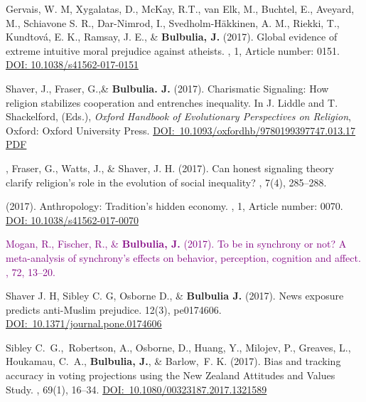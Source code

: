 \documentclass{article}
\begin{document}
\begin{thebibliography}{99}
Gervais, W. M, Xygalatas, D., McKay, R.T.,  van Elk, M., Buchtel, E., Aveyard, M., Schiavone S. R.,  Dar-Nimrod, I.,  Svedholm-H{\"a}kkinen, A. M., Riekki, T., Kundtov{\'a}, E. K.,  Ramsay, J. E., \& {\bf Bulbulia, J.} (2017).
\newblock Global evidence of extreme intuitive moral prejudice against atheists.
, 1, Article number: 0151. 
\href{https://doi.org/10.1038/s41562-017-0151}{DOI: 10.1038/s41562-017-0151}


Shaver, J., Fraser, G.,\&  {\bf Bulbulia. J.} (2017). 
\newblock Charismatic Signaling: How religion stabilizes cooperation and entrenches inequality. 
\newblock In J. Liddle and T. Shackelford, (Eds.), {\em Oxford Handbook of Evolutionary Perspectives on Religion},  Oxford: Oxford University Press. 
\newblock \href{https://doi.org/10.1093/oxfordhb/9780199397747.013.17}{DOI:~10.1093/oxfordhb/9780199397747.013.17}
\href{https://www.dropbox.com/s/bnxz7r89jdt93uj/oxfordhb-9780199397747-e-17.pdf?dl=0}{PDF}


, Fraser, G., Watts, J., \& Shaver, J. H. (2017). 
\newblock Can honest signaling theory clarify religion's role in the evolution of social inequality? 
, 7(4), 285--288.


 (2017). 
\newblock Anthropology: Tradition's hidden economy. 
, 1, Article number: 0070. 
\href{https://doi.org/10.1038/s41562-017-0070}{DOI: 10.1038/s41562-017-0070}


\textcolor{Purple}{
Mogan, R., Fischer, R., \& {\bf Bulbulia, J.} (2017). 
\newblock To be in synchrony or not? A meta-analysis of synchrony's effects on behavior, perception, cognition and affect.
, 72, 13--20.}


Shaver J. H, Sibley C. G, Osborne D., \& {\bf Bulbulia J.} (2017).
\newblock  News exposure predicts anti-Muslim prejudice. 
 12(3), pe0174606. 
\href{https://doi.org/10.1371/journal.pone.0174606}{DOI:~10.1371/journal.pone.0174606}



Sibley C.~G.,~Robertson, A., Osborne, D., Huang, Y., Milojev, P., Greaves, L., Houkamau, C.~A., {\bf Bulbulia, J.}, \& Barlow,~F. K. (2017).
\newblock Bias and tracking accuracy in voting projections using the {N}ew
  {Z}ealand {A}ttitudes and {V}alues Study.
, 69(1), 16--34.
 \href{https://doi.org/10.1080/00323187.2017.1321589}{DOI:~10.1080/00323187.2017.1321589}



\end{thebibliography}
\end{document}
